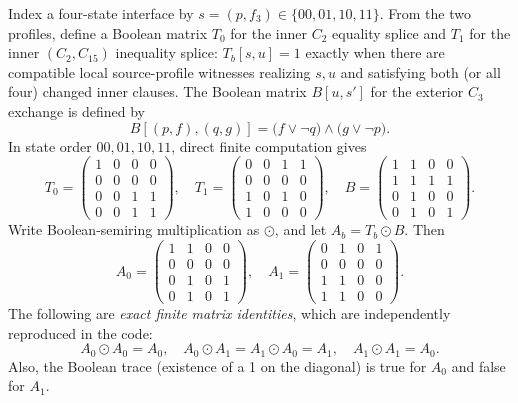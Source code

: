 \documentclass[11pt]{article}
\begin{document}
Index a four-state interface by $s=(p,f_3)\in\{00,01,10,11\}$. From the two profiles, define a Boolean matrix $T_0$ for the inner $C_2$ equality splice and $T_1$ for the inner $(C_2,C_{15})$ inequality splice: $T_b[s,u]=1$ exactly when there are compatible local source-profile witnesses realizing $s,u$ and satisfying both (or all four) changed inner clauses. The Boolean matrix $B[u,s']$ for the exterior $C_3$ exchange is defined by
\[
 B[(p,f),(q,g)]=\bigl(f\lor\neg q\bigr)\land\bigl(g\lor\neg p\bigr).
\]
In state order $00,01,10,11$, direct finite computation gives
\[
T_0=\begin{pmatrix}1&0&0&0\\0&0&0&0\\0&0&1&1\\0&0&1&1\end{pmatrix},\quad
T_1=\begin{pmatrix}0&0&1&1\\0&0&0&0\\1&0&1&0\\1&0&0&0\end{pmatrix},\quad
B=\begin{pmatrix}1&1&0&0\\1&1&1&1\\0&1&0&0\\0&1&0&1\end{pmatrix}.
\]
Write Boolean-semiring multiplication as $\odot$, and let $A_b=T_b\odot B$. Then
\[
A_0=\begin{pmatrix}1&1&0&0\\0&0&0&0\\0&1&0&1\\0&1&0&1\end{pmatrix},\quad
A_1=\begin{pmatrix}0&1&0&1\\0&0&0&0\\1&1&0&0\\1&1&0&0\end{pmatrix}.
\]
The following are \emph{exact finite matrix identities}, which are independently reproduced in the code:
\[
 \boxed{A_0\odot A_0=A_0,\quad A_0\odot A_1=A_1\odot A_0=A_1,\quad A_1\odot A_1=A_0.}\tag{1}
\]
Also, the Boolean trace (existence of a 1 on the diagonal) is true for $A_0$ and false for $A_1$.
\end{document}
